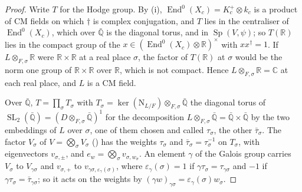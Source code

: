 \documentclass[11pt,reqno]{amsart}
\theoremstyle{plain}
\theoremstyle{definition}
\theoremstyle{remark}
\newcommand{\QQ}{\mathbb{Q}}
\newcommand{\RR}{\mathbb{R}}
\newcommand{\CC}{\mathbb{C}}
\newcommand{\Nm}{\mathrm{N}}             %
\DeclareMathOperator{\End}{End}
\DeclareMathOperator{\SL}{SL}
\DeclareMathOperator{\Sp}{Sp}
\begin{document}
\begin{proof}
Write $T$ for the Hodge group. By (i), $\End^{0}(X_{c})
=K_{c}^{+}\otimes k_{c}$ is a product of CM fields on which $\dagger$ is
complex conjugation, and $T$ lies in the centraliser of $\End^{0}(X_{c})$,
which over $\bar{\QQ}$ is the diagonal torus, and in $\Sp(V,\psi)$; so
$T(\RR)$ lies in the compact group of the $x\in(\End^{0}(X_{c})\otimes\RR)
^{\times}$ with $xx^{\dagger}=1$. If $L\otimes_{F,\sigma}\RR$ were
$\RR\times\RR$ at a real place $\sigma$, the factor of $T(\RR)$ at $\sigma$
would be the norm one group of $\RR\times\RR$ over $\RR$, which is not
compact. Hence $L\otimes_{F,\sigma}\RR=\CC$ at each real place, and $L$ is a
CM field.

Over $\bar{\QQ}$, $T=\prod_{\sigma}T_{\sigma}$ with $T_{\sigma}
=\ker(\Nm_{L/F})\otimes_{F,\sigma}\bar{\QQ}$ the diagonal torus of
$\SL_{2}(\bar{\QQ})=(D\otimes_{F,\sigma}\bar{\QQ})^{1}$ for the decomposition
$L\otimes_{F,\sigma}\bar{\QQ}=\bar{\QQ}\times\bar{\QQ}$ by the two embeddings
of $L$ over $\sigma$, one of them chosen and called $\tau_{\sigma}$, the
other $\bar{\tau}_{\sigma}$. The factor $V_{\sigma}$ of
$V=\bigotimes_{\sigma}V_{\sigma}$ () has the weights
$\tau_{\sigma}$ and $\bar{\tau}_{\sigma}=\tau_{\sigma}^{-1}$ on $T_{\sigma}$,
with eigenvectors $v_{\sigma,\pm}$, and $e_{w}=\bigotimes_{\sigma}
v_{\sigma,w_{\sigma}}$. An element $\gamma$ of the Galois group carries
$V_{\sigma}$ to $V_{\gamma\sigma}$ and $v_{\sigma,+}$ to
$v_{\gamma\sigma,\varepsilon_{\gamma}(\sigma)}$, where
$\varepsilon_{\gamma}(\sigma)=1$ if $\gamma\tau_{\sigma}=\tau_{\gamma\sigma}$
and $-1$ if $\gamma\tau_{\sigma}=\bar{\tau}_{\gamma\sigma}$; so it acts on
the weights by $(\gamma w)_{\gamma\sigma}=\varepsilon_{\gamma}(\sigma)
w_{\sigma}$.


\end{proof}
\end{document}
